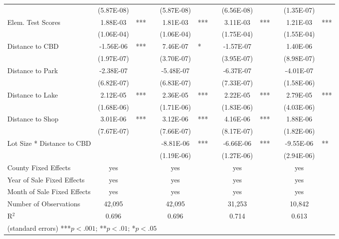 \documentclass{article}\usepackage{graphicx, color}
\newcommand\T{\rule{0pt}{2.6ex}}       %
\begin{document}
\begin{table}
{\begin{tabular}{lclcclcclccl}
          & (5.87E-08) &       &       & (5.87E-08) &   &   & (6.56E-08) &       &       & (1.35E-07) &  \\
\T  Elem. Test Scores & 1.88E-03 & *** &   & 1.81E-03 & ***   &   & 3.11E-03 & *** & & 1.21E-03 & *** \\
          & (1.06E-04) &  &   & (1.06E-04) &   &       & (1.75E-04) &       &       & (1.55E-04) &  \\
\T  Distance to CBD & -1.56E-06 & ***  &  & 7.46E-07 & *     &  & -1.57E-07 &   &       & 1.40E-06 &  \\
          & (1.97E-07) &       &       & (3.70E-07) &       &       & (3.95E-07) &   &   & (8.98E-07) &  \\
\T  Distance to Park & -2.38E-07 &   &    & -5.48E-07 &    &   & -6.37E-07 &  &   & -4.01E-07 &  \\
          & (6.82E-07) & &   & (6.83E-07) &       &       & (7.33E-07) &       &       & (1.58E-06) &  \\
\T  Distance to Lake & 2.12E-05 & ***   &   & 2.36E-05 & ***   &   & 2.22E-05 & ***   & & 2.79E-05 & *** \\
          & (1.68E-06) &       &    & (1.71E-06) &   &    & (1.83E-06) & &  & (4.03E-06) &  \\
\T  Distance to Shop & 3.01E-06 & ***   &    & 3.12E-06 & ***   & & 4.16E-06 & ***   &    & 1.88E-06 &  \\
          & (7.67E-07) &       &       & (7.66E-07) &       &       & (8.17E-07) &  & & (1.82E-06) &  \\
\T  Lot Size * Distance to CBD &  &   & & -8.81E-06 & *** & & -6.66E-06 & ***   &       & -9.55E-06 & ** \\
          &   &   &   & (1.19E-06) &       &       & (1.27E-06) &       &       & (2.94E-06) &  \\
\T  County Fixed Effects & yes   &   &   & yes   &       &       & yes   &       &       & yes   &  \\
    Year of Sale Fixed Effects & yes   &   &   & yes   &   &       & yes   &       &       & yes   &  \\
    Month of Sale Fixed Effects & yes   &   &   & yes   &   &       & yes   &       &       & yes   &  \\ \hline
\T  Number of Observations &        42,095  &   &  &    42,095  & & &   31,253  & & &    10,842  &  \\
    R$^2$   & 0.696 &       &       & 0.696 &       &       & 0.714 &       &       & 0.613 &  \\
 \multicolumn{12}{l}{(standard errors) ***$p<.001$; **$p<.01$; *$p<.05$}  \\
    \end{tabular}%
}
\end{table}
\end{document}
